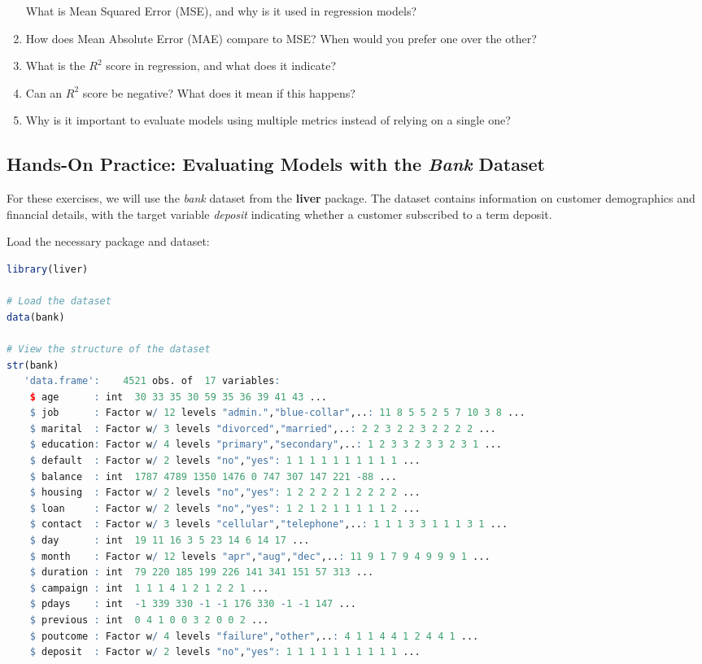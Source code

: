 \documentclass[
]{book}
\theoremstyle{definition}
\theoremstyle{definition}
\theoremstyle{definition}
\theoremstyle{definition}
\theoremstyle{remark}
\begin{document}
\begin{enumerate}
  What is Mean Squared Error (MSE), and why is it used in regression models?\\
\item
  How does Mean Absolute Error (MAE) compare to MSE? When would you prefer one over the other?\\
\item
  What is the \(R^2\) score in regression, and what does it indicate?\\
\item
  Can an \(R^2\) score be negative? What does it mean if this happens?\\
\item
  Why is it important to evaluate models using multiple metrics instead of relying on a single one?
\end{enumerate}

\subsection*{\texorpdfstring{Hands-On Practice: Evaluating Models with the \emph{Bank} Dataset}{Hands-On Practice: Evaluating Models with the Bank Dataset}}\label{hands-on-practice-evaluating-models-with-the-bank-dataset}

For these exercises, we will use the \emph{bank} dataset from the \textbf{liver} package. The dataset contains information on customer demographics and financial details, with the target variable \emph{deposit} indicating whether a customer subscribed to a term deposit.

Load the necessary package and dataset:

\begin{lstlisting}[language=R]
library(liver)

# Load the dataset
data(bank)

# View the structure of the dataset
str(bank)
   'data.frame':    4521 obs. of  17 variables:
    $ age      : int  30 33 35 30 59 35 36 39 41 43 ...
    $ job      : Factor w/ 12 levels "admin.","blue-collar",..: 11 8 5 5 2 5 7 10 3 8 ...
    $ marital  : Factor w/ 3 levels "divorced","married",..: 2 2 3 2 2 3 2 2 2 2 ...
    $ education: Factor w/ 4 levels "primary","secondary",..: 1 2 3 3 2 3 3 2 3 1 ...
    $ default  : Factor w/ 2 levels "no","yes": 1 1 1 1 1 1 1 1 1 1 ...
    $ balance  : int  1787 4789 1350 1476 0 747 307 147 221 -88 ...
    $ housing  : Factor w/ 2 levels "no","yes": 1 2 2 2 2 1 2 2 2 2 ...
    $ loan     : Factor w/ 2 levels "no","yes": 1 2 1 2 1 1 1 1 1 2 ...
    $ contact  : Factor w/ 3 levels "cellular","telephone",..: 1 1 1 3 3 1 1 1 3 1 ...
    $ day      : int  19 11 16 3 5 23 14 6 14 17 ...
    $ month    : Factor w/ 12 levels "apr","aug","dec",..: 11 9 1 7 9 4 9 9 9 1 ...
    $ duration : int  79 220 185 199 226 141 341 151 57 313 ...
    $ campaign : int  1 1 1 4 1 2 1 2 2 1 ...
    $ pdays    : int  -1 339 330 -1 -1 176 330 -1 -1 147 ...
    $ previous : int  0 4 1 0 0 3 2 0 0 2 ...
    $ poutcome : Factor w/ 4 levels "failure","other",..: 4 1 1 4 4 1 2 4 4 1 ...
    $ deposit  : Factor w/ 2 levels "no","yes": 1 1 1 1 1 1 1 1 1 1 ...
\end{lstlisting}
\end{document}
